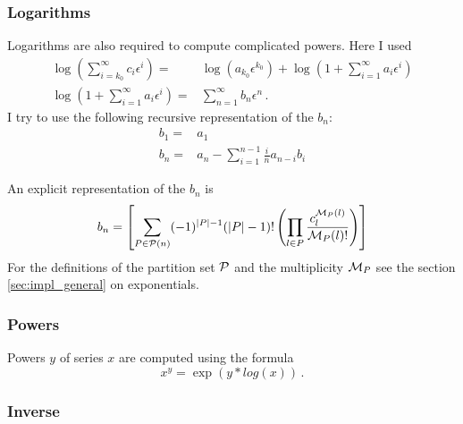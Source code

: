 \documentclass{article}
\begin{document}
\subsubsection{Logarithms}
\label{sec:impl_log}

Logarithms are also required to compute complicated powers. Here I used
\begin{align}
  \label{eq:log}
\log\left(\sum_{i=k_0}^{\infty}c_i \epsilon^i\right)=&\log\left(a_{k_0}\epsilon^{k_0}\right)+\log\left(1+\sum_{i=1}^{\infty}a_i \epsilon^i\right)\\
\log\left(1+\sum_{i=1}^{\infty}a_i \epsilon^i\right)=&\sum_{n=1}^\infty
b_n\epsilon^n\,.
\end{align}
I try to use the following recursive representation of the $b_n$:
\begin{align}
  \label{eq:log_rec}
b_1=&a_1\\
b_n =& a_n - \sum_{i=1}^{n-1} \frac{i}{n} a_{n-i}b_{i}
\end{align}

An explicit representation of the $b_n$ is
\begin{equation}
  \label{eq:log_expl}
  b_n=\left[\sum_{P \in {\cal P}(n)} (-1)^{|P|-1}(|P|-1)!\left(\prod_{l \in P} \frac{c^{{\cal M}_P(l)}_l}{{\cal M}_P(l)!} \right)\right]
\end{equation}
For the definitions of the partition set ${\cal P}$ and the
multiplicity ${\cal M}_P$ see the section \ref{sec:impl_general} on
exponentials.

\subsubsection{Powers}
\label{sec:impl_pow}

Powers $y$ of series $x$ are computed using the formula
\begin{equation}
  \label{eq:pow}
  x^y=\exp(y*log(x))\,.
\end{equation}


\subsubsection{Inverse}
\label{sec:impl_inverse}
\end{document}
